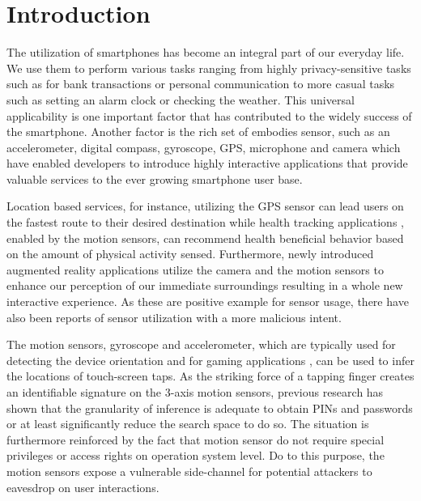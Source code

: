 \chapter{Introduction\label{cha:chapter1}}
The utilization of smartphones has become an integral part of our everyday life. We use them to perform various tasks ranging from highly privacy-sensitive tasks such as for bank transactions or personal communication to more casual tasks such as setting an alarm clock or checking the weather. This universal applicability is one important factor that has contributed to the widely success of the smartphone. Another factor is the rich set of embodies sensor, such as an accelerometer, digital compass, gyroscope, GPS, microphone and camera \cite{5560598} which have enabled developers to introduce highly interactive applications that provide valuable services to the ever growing smartphone user base.



Location based services, for instance, utilizing the GPS sensor \cite{link2011footpath} can lead users on the fastest route to their desired destination while health tracking applications \cite{case2015accuracy}, enabled by the motion sensors, can recommend health beneficial behavior based on the amount of physical activity sensed. Furthermore, newly introduced augmented reality applications utilize the camera and the motion sensors to enhance our perception of our immediate surroundings resulting in a whole new interactive experience. As these are positive example for sensor usage, there have also been reports of sensor utilization with a more malicious intent.

The motion sensors, gyroscope and accelerometer, which are typically used for detecting the device orientation and for gaming applications \cite{feijoo2012mobile}, can be used to infer the locations of touch-screen taps. As the striking force of a tapping finger creates an identifiable signature on the 3-axis motion sensors, previous research has shown that the granularity of inference is adequate to obtain PINs and passwords \cite{Touchlogger, Tapprints, Accessory} or at least significantly reduce the search space to do so. The situation is furthermore reinforced by the fact that motion sensor do not require special privileges or access rights on operation system level. Do to this purpose, the motion sensors expose a vulnerable side-channel for potential attackers to eavesdrop on user interactions.

